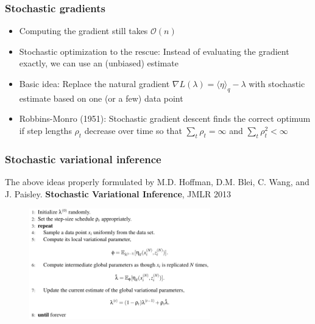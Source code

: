 \documentclass{beamer}
\begin{document}
\begin{frame}
  \frametitle{Stochastic gradients}

  \begin{itemize}
    \item Computing the gradient still takes $\mathcal{O}(n)$
    \item Stochastic optimization to the rescue:
      Instead of evaluating the gradient exactly, we can use
      an (unbiased) estimate
    \item Basic idea: Replace the natural gradient
      $\nabla L(\lambda) = \langle \eta \rangle_q - \lambda$
      with stochastic estimate based on one (or a few) data point
    \item Robbins-Monro (1951): Stochastic gradient descent
      finds the correct optimum if step lengths $\rho_t$ decrease
      over time so that $\sum_t \rho_t = \infty$ and $\sum_t \rho_t^2 < \infty$
  \end{itemize}
\end{frame}

\begin{frame}
  \frametitle{Stochastic variational inference}

  The above ideas properly formulated by
  M.D. Hoffman, D.M. Blei, C. Wang, and J. Paisley. \textbf{Stochastic Variational Inference}, JMLR 2013

  \begin{figure}
  \begin{center}
  \includegraphics[width=0.7\textwidth]{SVI.png}
  \end{center}
  \end{figure}

\end{frame}
\end{document}
